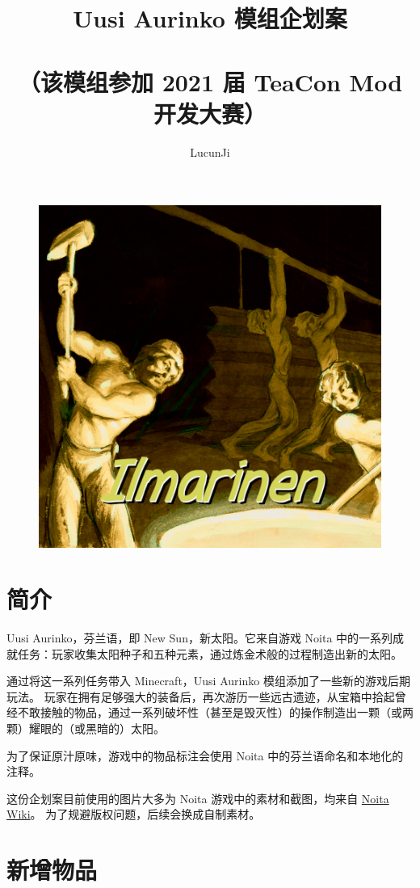 \documentclass[11pt]{article}
\title{Uusi Aurinko 模组企划案\\
\ \\
\small{（该模组参加 2021 届 TeaCon Mod 开发大赛）}}
\author{LucunJi}
\begin{document}
    \maketitle
    \begin{figure}[ht!]
        \centering
        \includegraphics[width=.5\textwidth]{../Ilmarinen}
        \label{fig:group}
    \end{figure}

    \clearpage
    \tableofcontents

    \clearpage
    \section{简介}\label{sec:intro}
    Uusi Aurinko，芬兰语，即 New Sun，新太阳。它来自游戏 Noita 中的一系列成就任务：玩家收集太阳种子和五种元素，通过炼金术般的过程制造出新的太阳。

    通过将这一系列任务带入 Minecraft，Uusi Aurinko 模组添加了一些新的游戏后期玩法。
    玩家在拥有足够强大的装备后，再次游历一些远古遗迹，从宝箱中拾起曾经不敢接触的物品，通过一系列破坏性（甚至是毁灭性）的操作制造出一颗（或两颗）耀眼的（或黑暗的）太阳。

    为了保证原汁原味，游戏中的物品标注会使用 Noita 中的芬兰语命名和本地化的注释。

    \vspace{1em}
    这份企划案目前使用的图片大多为 Noita 游戏中的素材和截图，均来自 \href{https://noita.fandom.com/wiki/Noita_Wiki}{Noita Wiki}。
    为了规避版权问题，后续会换成自制素材。

    \clearpage
    \section{新增物品}\label{sec:new-items}
\end{document}
